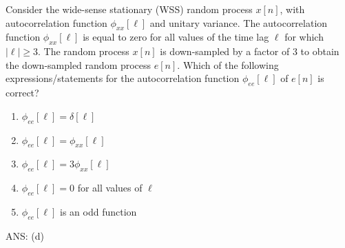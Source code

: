 \begin{q}{}
Consider the wide-sense stationary (WSS) random process $x[n]$, with autocorrelation function $\phi_{xx}[\ell]$ and unitary variance. The autocorrelation function $\phi_{xx}[\ell]$ is equal to zero for all values of the time lag $\ell$ for which $|\ell| \geq 3$. The random process $x[n]$ is down-sampled by a factor of 3 to obtain the down-sampled random process $e[n]$. Which of the following expressions/statements for the autocorrelation function $\phi_{ee}[\ell]$ of $e[n]$ is correct?

\begin{enumerate}[label=(\alph*)]
    \item $\phi_{ee}[\ell] = \delta[\ell]$
    \item $\phi_{ee}[\ell] = \phi_{xx}[\ell]$
    \item $\phi_{ee}[\ell] = 3\phi_{xx}[\ell]$
    \item $\phi_{ee}[\ell] = 0$ for all values of $\ell$
    \item $\phi_{ee}[\ell]$ is an odd function
\end{enumerate}

\begin{flushright}
    \begin{blueenv}
        ANS: (d)
    \end{blueenv}
\end{flushright}
\end{q}
